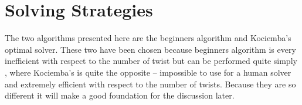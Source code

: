 \chapter{Solving Strategies}
The two algorithms presented here are the beginners algorithm and Kociemba's optimal solver.
These two have been chosen because beginners algorithm is every inefficient with respect to the number of twist but can be performed quite simply \cite{beginner}, where Kociemba's is quite the opposite -- impossible to use for a human solver and extremely efficient with respect to the number of twists.
Because they are so different it will make a good foundation for the discussion later.

	
	

